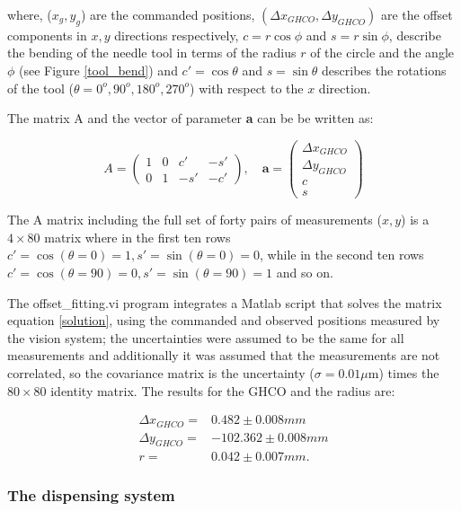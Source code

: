 \noindent where, ($x_g,y_g$) are the commanded positions, $(\Delta x_{GHCO},\Delta y_{GHCO})$ are the offset components in $x,y$ directions respectively, $c=r\cos\phi$ and  $s=r\sin\phi$, describe the bending of the needle tool in terms of the radius $r$ of the circle and the angle $\phi$ (see Figure \ref{tool_bend}) and $c'=\cos\theta$ and  $s=\sin\theta$ describes the rotations of the tool ($\theta=0^o, 90^o, 180^o, 270^o$) with respect to the $x$ direction.

The matrix A and the vector of parameter \textbf{a} can be be written as:

\begin{equation}
  A=
  \begin{pmatrix}
    1  & 0  & c' & -s' \\
    0  & 1  & -s' & -c' 
  \end{pmatrix}, \quad
  \textbf{a}=
  \begin{pmatrix}
    \Delta x_{GHCO}\\ 
    \Delta y_{GHCO}\\
    c \\
    s 
  \end{pmatrix}
\end{equation}

The A matrix including the full set of forty pairs of measurements ($x,y$) is a $4\times80$ matrix where in the first ten rows $c'=\cos(\theta=0)=1, s'=\sin(\theta=0)=0$, while in the second ten rows $c'=\cos(\theta=90)=0, s'=\sin(\theta=90)=1$ and so on.   

The offset\_fitting.vi program integrates a Matlab script that solves the matrix equation \ref{solution}, using the commanded and observed positions measured by the vision system; the uncertainties were assumed to be the same for all measurements and additionally it was assumed that the measurements are not correlated, so the covariance matrix is the uncertainty ($\sigma=0.01 \mu$m) times the $80\times80$ identity matrix. The results for the GHCO and the radius are:

\begin{align}
  \Delta x_{GHCO}=& 0.482 \pm 0.008 mm\nonumber\\
  \Delta y_{GHCO}=& -102.362 \pm 0.008 mm\\
  r=&0.042 \pm 0.007 mm\nonumber.
\end{align}

\subsubsection*{The dispensing system}

